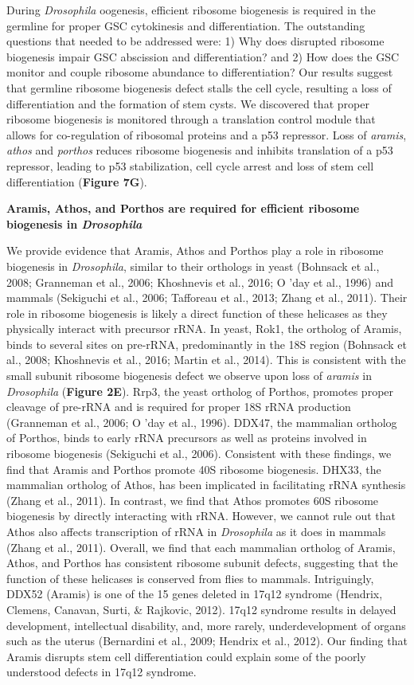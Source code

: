 \documentclass[12pt,twoside]{reedthesis}
\begin{document}
During \emph{Drosophila} oogenesis, efficient ribosome biogenesis is required
in the germline for proper GSC cytokinesis and differentiation. The
outstanding questions that needed to be addressed were: 1) Why does
disrupted ribosome biogenesis impair GSC abscission and differentiation?
and 2) How does the GSC monitor and couple ribosome abundance to
differentiation? Our results suggest that germline ribosome biogenesis
defect stalls the cell cycle, resulting a loss of differentiation and
the formation of stem cysts. We discovered that proper ribosome
biogenesis is monitored through a translation control module that allows
for co-regulation of ribosomal proteins and a p53 repressor. Loss of
\emph{aramis}, \emph{athos} and \emph{porthos} reduces ribosome biogenesis and inhibits
translation of a p53 repressor, leading to p53 stabilization, cell cycle
arrest and loss of stem cell differentiation (\textbf{Figure 7G}).

\textbf{Aramis, Athos, and Porthos are required for efficient ribosome
biogenesis in \emph{Drosophila}}

We provide evidence that Aramis, Athos and Porthos play a role in
ribosome biogenesis in \emph{Drosophila}, similar to their orthologs in yeast
(Bohnsack et al., 2008; Granneman et al., 2006; Khoshnevis et al., 2016; O 'day et al., 1996) and
mammals (Sekiguchi et al., 2006; Tafforeau et al., 2013; Zhang et al., 2011). Their role in ribosome
biogenesis is likely a direct function of these helicases as they
physically interact with precursor rRNA. In yeast, Rok1, the ortholog of
Aramis, binds to several sites on pre-rRNA, predominantly in the 18S
region (Bohnsack et al., 2008; Khoshnevis et al., 2016; Martin et al., 2014). This is consistent with the
small subunit ribosome biogenesis defect we observe upon loss of
\emph{aramis} in \emph{Drosophila} (\textbf{Figure 2E}). Rrp3, the yeast ortholog of
Porthos, promotes proper cleavage of pre-rRNA and is required for proper
18S rRNA production (Granneman et al., 2006; O 'day et al., 1996).
DDX47, the mammalian ortholog of Porthos, binds to early rRNA precursors
as well as proteins involved in ribosome biogenesis
(Sekiguchi et al., 2006). Consistent with these findings,
we find that Aramis and Porthos promote 40S ribosome biogenesis. DHX33,
the mammalian ortholog of Athos, has been implicated in facilitating
rRNA synthesis (Zhang et al., 2011). In contrast,
we find that Athos promotes 60S ribosome biogenesis by directly
interacting with rRNA. However, we cannot rule out that Athos also
affects transcription of rRNA in \emph{Drosophila} as it does in mammals
(Zhang et al., 2011). Overall, we find that each
mammalian ortholog of Aramis, Athos, and Porthos has consistent ribosome
subunit defects, suggesting that the function of these helicases is
conserved from flies to mammals. Intriguingly, DDX52 (Aramis) is one of
the 15 genes deleted in 17q12 syndrome
(Hendrix, Clemens, Canavan, Surti, \& Rajkovic, 2012). 17q12 syndrome results in
delayed development, intellectual disability, and, more rarely,
underdevelopment of organs such as the uterus
(Bernardini et al., 2009; Hendrix et al., 2012). Our finding that Aramis
disrupts stem cell differentiation could explain some of the poorly
understood defects in 17q12 syndrome.
\end{document}

